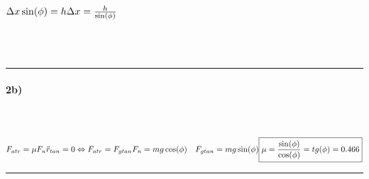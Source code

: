\begin{minipage}[t]{0.5\textwidth}
$
\Delta x \sin(\phi)=h\\
\Delta x=\frac{h}{\sin(\phi)}\\
$
%
%
\end{minipage}
\\
\\
\hrule
\paragraph{2b)} ~\\
\\
$
F_{atr}=\mu F_{n}\\
\ddot r_{tan}=0 \Leftrightarrow F_{atr}=F_{gtan}\\
\\
F_n=mg\cos(\phi) \quad F_{gtan}=mg\sin(\phi)\\
\\
\boxed{\mu=\frac{\sin(\phi)}{\cos(\phi)}=tg(\phi)=0.466}\\
$
%
\\
\hrule
 \pagebreak
